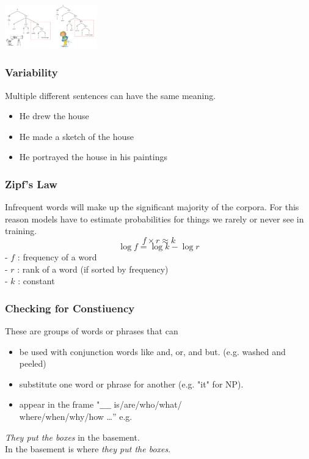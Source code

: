 \documentclass[8pt]{extarticle} %
\begin{document}
\begin{multicols*}{3}
\begin{center}
    \includegraphics[width=0.3\textwidth]{media/girl.png}
\end{center}

\subsubsection*{Variability}
Multiple different sentences can have the same meaning. 
\begin{itemize}[label=\textbullet, labelsep=0.3em, leftmargin=0.5em, itemsep=0em]
    \item He drew the house
    \item He made a sketch of the house
    \item He portrayed the house in his paintings
\end{itemize}

\subsubsection*{Zipf's Law}
Infrequent words will make up the significant majority of the corpora.
For this reason models have to estimate probabilities for things we rarely or never see in training.
$$f\times r\approx k$$
$$\log f = \log k - \log r$$
- $f$ : frequency of a word\\
- $r$ : rank of a word (if sorted by frequency)\\
- $k$ : constant

\subsubsection*{Checking for Constiuency}
These are groups of words or phrases that can
\begin{itemize}[label=\textbullet, labelsep=0.3em, leftmargin=0.5em, itemsep=0em]
\item be used with conjunction words like and, or, and but. (e.g. washed and peeled)
\item substitute one word or phrase for another (e.g. "it" for NP).
\item appear in the frame "$\_\_\_\_$ is/are/who/what/\\where/when/why/how \ldots'' e.g.
\end{itemize}   
\textit{They put the boxes} in the basement.\\
In the basement is where \textit{they put the boxes}. 


\end{multicols*}
\end{document}
